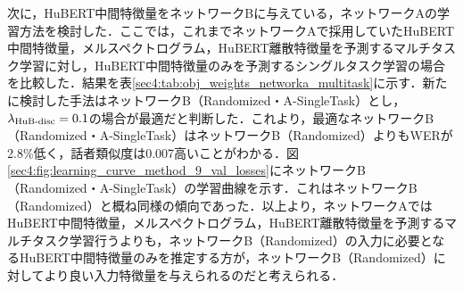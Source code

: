 次に，HuBERT中間特徴量をネットワークBに与えている，ネットワークAの学習方法を検討した．ここでは，これまでネットワークAで採用していたHuBERT中間特徴量，メルスペクトログラム，HuBERT離散特徴量を予測するマルチタスク学習に対し，HuBERT中間特徴量のみを予測するシングルタスク学習の場合を比較した．結果を表\ref{sec4:tab:obj_weights_networka_multitask}に示す．新たに検討した手法はネットワークB（Randomized・A-SingleTask）とし，$\lambda_{\text{HuB-disc}} = 0.1$の場合が最適だと判断した．これより，最適なネットワークB（Randomized・A-SingleTask）はネットワークB（Randomized）よりもWERが2.8\%低く，話者類似度は0.007高いことがわかる．図\ref{sec4:fig:learning_curve_method_9_val_losses}にネットワークB（Randomized・A-SingleTask）の学習曲線を示す．これはネットワークB（Randomized）と概ね同様の傾向であった．以上より，ネットワークAではHuBERT中間特徴量，メルスペクトログラム，HuBERT離散特徴量を予測するマルチタスク学習行うよりも，ネットワークB（Randomized）の入力に必要となるHuBERT中間特徴量のみを推定する方が，ネットワークB（Randomized）に対してより良い入力特徴量を与えられるのだと考えられる．

\begin{table}[bt]
    \centering
    \caption{ネットワークAにおけるマルチタスク学習の有無による比較}
    \label{sec4:tab:obj_weights_networka_multitask}
    \begin{center}
        \renewcommand{\arraystretch}{1.0} %
        \setlength{\tabcolsep}{8pt}      %
    \end{center}
\end{table}

